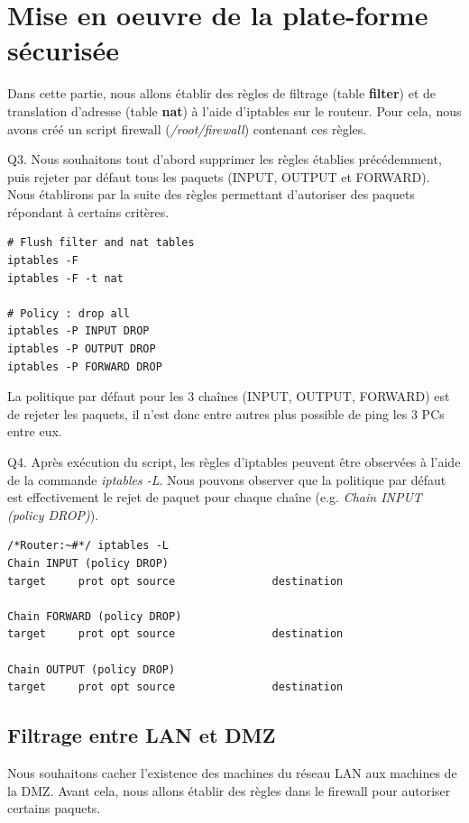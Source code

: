 \documentclass[frenchb, 11pt]{article}
\newlength{\leftbarwidth}
\newlength{\leftbarsep}
\newcommand*{\leftbarcolorcmd}{\color{leftbarcolor}} %
\renewenvironment{leftbar}{%
    \def\FrameCommand{{\leftbarcolorcmd{\vrule width \leftbarwidth\relax\hspace {\leftbarsep}}}}%
    \MakeFramed {\advance \hsize -\width \FrameRestore }%
}{%
    \endMakeFramed
}
\begin{document}
\section{Mise en oeuvre de la plate-forme sécurisée}
Dans cette partie, nous allons établir des règles de filtrage (table \textbf{filter}) et de translation d'adresse (table \textbf{nat}) à l'aide d'iptables sur le routeur. Pour cela, nous avons créé un script firewall (\emph{/root/firewall}) contenant ces règles.

\begin{leftbar}
	\noindent Q3. Nous souhaitons tout d'abord supprimer les règles établies précédemment, puis rejeter par défaut tous les paquets (INPUT, OUTPUT et FORWARD). Nous établirons par la suite des règles permettant d'autoriser des paquets répondant à certains critères.
	\begin{lstlisting}[numbers=none]
# Flush filter and nat tables
iptables -F
iptables -F -t nat

# Policy : drop all
iptables -P INPUT DROP
iptables -P OUTPUT DROP
iptables -P FORWARD DROP
	\end{lstlisting}
\end{leftbar}

La politique par défaut pour les 3 chaînes (INPUT, OUTPUT, FORWARD) est de rejeter les paquets, il n'est donc entre autres plus possible de ping les 3 PCs entre eux.

\begin{leftbar}
	\noindent Q4. Après exécution du script, les règles d'iptables peuvent être observées à l'aide de la commande \emph{iptables -L}. Nous pouvons observer que la politique par défaut est effectivement le rejet de paquet pour chaque chaîne (e.g. \emph{Chain INPUT (policy DROP)}).
	\begin{lstlisting}[numbers=none]
/*Router:~#*/ iptables -L
Chain INPUT (policy DROP)
target     prot opt source               destination         

Chain FORWARD (policy DROP)
target     prot opt source               destination         

Chain OUTPUT (policy DROP)
target     prot opt source               destination
	\end{lstlisting}
\end{leftbar}

\subsection{Filtrage entre LAN et DMZ}
Nous souhaitons cacher l'existence des machines du réseau LAN aux machines de la DMZ. Avant cela, nous allons établir des règles dans le firewall pour autoriser certains paquets.
\end{document}
